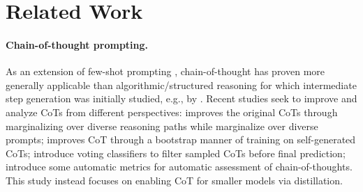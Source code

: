 \documentclass[11pt]{article}
\newcommand\jack[1]{{\color{orange}[#1]$_{Jack}$}}
\begin{document}












\section{Related Work}


\paragraph{Chain-of-thought prompting.} As an extension of few-shot prompting \cite{NEURIPS2020_1457c0d6}, chain-of-thought has proven more generally applicable than algorithmic/structured reasoning for which intermediate step generation was initially studied, e.g., by \citet{roy2016solving,ling2017program,chiang2018semantically,https://doi.org/10.48550/arxiv.2112.00114}. Recent studies seek to improve and analyze CoTs from different perspectives: \citet{wang2022self} improves the original CoTs through marginalizing over diverse reasoning paths while \citet{wang2022rationale} marginalize over diverse prompts; \citet{zelikman2022star,huang2022large} improves CoT through a bootstrap manner of training on self-generated CoTs; \citet{li2022advance} introduce voting classifiers to filter sampled CoTs before final prediction; \citet{golovneva2022roscoe} introduce some automatic metrics for automatic assessment of chain-of-thoughts. This study instead focuses on enabling CoT for smaller models via distillation.
\end{document}
